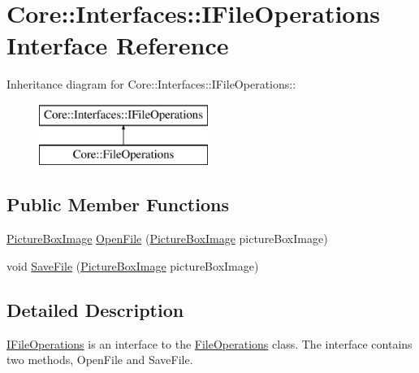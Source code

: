 \hypertarget{interface_core_1_1_interfaces_1_1_i_file_operations}{
\section{Core::Interfaces::IFileOperations Interface Reference}
\label{interface_core_1_1_interfaces_1_1_i_file_operations}
}
Inheritance diagram for Core::Interfaces::IFileOperations::\begin{figure}[H]
\begin{center}
\leavevmode
\includegraphics[height=2cm]{interface_core_1_1_interfaces_1_1_i_file_operations}
\end{center}
\end{figure}
\subsection*{Public Member Functions}
\begin{DoxyCompactItemize}
\item 
\hyperlink{class_core_1_1_images_1_1_picture_box_image}{PictureBoxImage} \hyperlink{interface_core_1_1_interfaces_1_1_i_file_operations_a373c3e1cc40a59b65e77cf9551463419}{OpenFile} (\hyperlink{class_core_1_1_images_1_1_picture_box_image}{PictureBoxImage} pictureBoxImage)
\item 
void \hyperlink{interface_core_1_1_interfaces_1_1_i_file_operations_a254301628fd3053115f557626aa71f14}{SaveFile} (\hyperlink{class_core_1_1_images_1_1_picture_box_image}{PictureBoxImage} pictureBoxImage)
\end{DoxyCompactItemize}


\subsection{Detailed Description}
\hyperlink{interface_core_1_1_interfaces_1_1_i_file_operations}{IFileOperations} is an interface to the \hyperlink{class_core_1_1_file_operations}{FileOperations} class. The interface contains two methods, OpenFile and SaveFile. 

